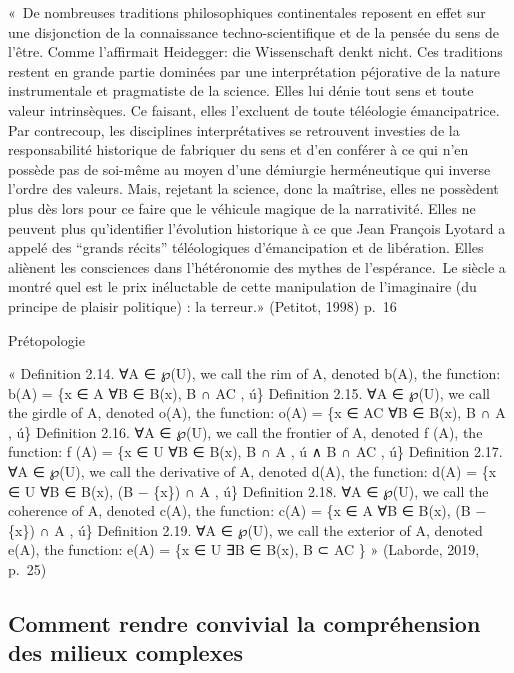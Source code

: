 \documentclass[
  letterpaper,
  DIV=11,
  numbers=noendperiod]{scrreprt}
\begin{document}
«~De nombreuses traditions philosophiques continentales reposent en
effet sur une disjonction de la connaissance techno-scientifique et de
la pensée du sens de l'être. Comme l'affirmait Heidegger: die
Wissenschaft denkt nicht. Ces traditions restent en grande partie
dominées par une interprétation péjorative de la nature instrumentale et
pragmatiste de la science. Elles lui dénie tout sens et toute valeur
intrinsèques. Ce faisant, elles l'excluent de toute téléologie
émancipatrice. Par contrecoup, les disciplines interprétatives se
retrouvent investies de la responsabilité historique de fabriquer du
sens et d'en conférer à ce qui n'en possède pas de soi-même au moyen
d'une démiurgie herméneutique qui inverse l'ordre des valeurs. Mais,
rejetant la science, donc la maîtrise, elles ne possèdent plus dès lors
pour ce faire que le véhicule magique de la narrativité. Elles ne
peuvent plus qu'identifier l'évolution historique à ce que Jean François
Lyotard a appelé des ``grands récits'' téléologiques d'émancipation et
de libération. Elles aliènent les consciences dans l'hétéronomie des
mythes de l'espérance.~Le siècle a montré quel est le prix inéluctable
de cette manipulation de l'imaginaire (du principe de plaisir politique)
: la terreur.» (Petitot, 1998) p.~16

Prétopologie

« Definition 2.14. ∀A ∈ ℘(U), we call the rim of A, denoted b(A), the
function: b(A) = \{x ∈ A \textbar{} ∀B ∈ B(x), B ∩ AC , ú\} Definition
2.15. ∀A ∈ ℘(U), we call the girdle of A, denoted o(A), the function:
o(A) = \{x ∈ AC \textbar{} ∀B ∈ B(x), B ∩ A , ú\} Definition 2.16. ∀A ∈
℘(U), we call the frontier of A, denoted f (A), the function: f (A) =
\{x ∈ U \textbar{} ∀B ∈ B(x), B ∩ A , ú ∧ B ∩ AC , ú\} Definition 2.17.
∀A ∈ ℘(U), we call the derivative of A, denoted d(A), the function: d(A)
= \{x ∈ U \textbar{} ∀B ∈ B(x), (B − \{x\}) ∩ A , ú\} Definition 2.18.
∀A ∈ ℘(U), we call the coherence of A, denoted c(A), the function: c(A)
= \{x ∈ A \textbar{} ∀B ∈ B(x), (B − \{x\}) ∩ A , ú\} Definition 2.19.
∀A ∈ ℘(U), we call the exterior of A, denoted e(A), the function: e(A) =
\{x ∈ U \textbar{} ∃B ∈ B(x), B ⊂ AC \} » (Laborde, 2019, p.~25)

\hypertarget{comment-rendre-convivial-la-compruxe9hension-des-milieux-complexes}{%
\subsection{Comment rendre convivial la compréhension des milieux
complexes}\label{comment-rendre-convivial-la-compruxe9hension-des-milieux-complexes}}
\end{document}
